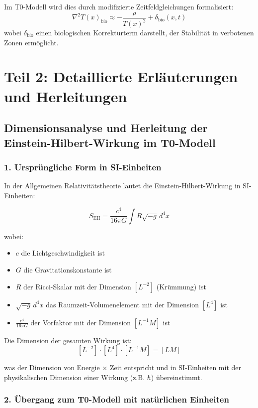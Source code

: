 \documentclass[12pt,a4paper]{article}
\newcommand{\Tfield}{T(x)}
\begin{document}
Im T0-Modell wird dies durch modifizierte Zeitfeldgleichungen formalisiert:
\[
\nabla^2 \Tfield_{\mathrm{bio}} \approx -\frac{\rho}{\Tfield^2} + \delta_{\mathrm{bio}}(x,t)
\]
wobei \(\delta_{\mathrm{bio}}\) einen biologischen Korrekturterm darstellt, der Stabilität in verbotenen Zonen ermöglicht.

\section*{Teil 2: Detaillierte Erläuterungen und Herleitungen}

\subsection*{Dimensionsanalyse und Herleitung der Einstein-Hilbert-Wirkung im T0-Modell}

\subsubsection*{1. Ursprüngliche Form in SI-Einheiten}

In der Allgemeinen Relativitätstheorie lautet die Einstein-Hilbert-Wirkung in SI-Einheiten:

\[
S_{\mathrm{EH}} = \frac{c^4}{16\pi G} \int R \sqrt{-g} \, d^4x
\]

wobei:
\begin{itemize}
	\item $c$ die Lichtgeschwindigkeit ist
	\item $G$ die Gravitationskonstante ist
	\item $R$ der Ricci-Skalar mit der Dimension $[L^{-2}]$ (Krümmung) ist
	\item $\sqrt{-g} \, d^4x$ das Raumzeit-Volumenelement mit der Dimension $[L^4]$ ist
	\item $\frac{c^4}{16\pi G}$ der Vorfaktor mit der Dimension $[L^{-1} M]$ ist
\end{itemize}

Die Dimension der gesamten Wirkung ist:
\[
[L^{-2}] \cdot [L^4] \cdot [L^{-1} M] = [L M]
\]

was der Dimension von Energie $\times$ Zeit entspricht und in SI-Einheiten mit der physikalischen Dimension einer Wirkung (z.B. $\hbar$) übereinstimmt.

\subsubsection*{2. Übergang zum T0-Modell mit natürlichen Einheiten}
\end{document}
